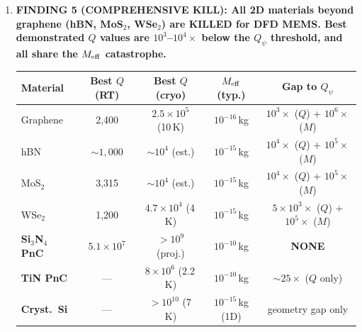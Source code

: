 \documentclass[11pt]{article}
\theoremstyle{definition}
\theoremstyle{remark}
\newcommand{\ee}[1]{\times 10^{#1}}
\newcommand{\Meff}{M_{\rm eff}}
\newcommand{\Qpsi}{Q_\psi}
\newcommand{\newfinding}[1]{\textcolor{teal}{\textbf{NEW FINDING:} #1}}
\begin{document}
\begin{tcolorbox}[colback=blue!5!white, colframe=blue!50!black,
  title=\textbf{W4i16 TOP 5 FINDINGS --- Ranked by Programme Impact}]
\begin{enumerate}
A metamaterial can increase local $u_{\rm EM}$ by concentrating the EM
field, but the total stored energy $U = u_{\rm EM} \times V_{\rm mode}$
is bounded by input power and EM $Q$. An SRF cavity already achieves
$Q_{\rm EM} \sim 10^{10}$ and $U \sim 10^{-2}$\,J. A metamaterial
concentrator with $V_{\rm meta} \sim 10^{-9}$\,m$^3$ reaches
$u_{\rm meta} \sim 10^7$\,J/m$^3$ but $U_{\rm meta} = 10^{-2}$\,J
--- \textbf{identical total stored energy, no net gain.}

Recent advances (Nature Comms.\ 2026: graded phononic metamaterials
on silicon wafers with $> 10^5$ unit cells; piezoelectric superlattice
phonon--polariton bandgaps, Frontiers in Physics 2025) demonstrate
that phononic bandgap engineering at the MEMS frequency scale
($\sim 1$\,MHz) is mature.

\newfinding{Phononic metamaterial vibration shield for MEMS. Bandgap
centred at MEMS defect mode ($\sim 1$\,MHz), bandwidth $\sim 100$\,kHz,
vibration isolation $> 60$\,dB. This directly addresses the Channel~B
dominant systematic (mechanical vibration, W3i9). Mount MEMS chip on
phononic metamaterial substrate. Compatible with all three tracks.
Cost \$10--30K. Should be added to Phase~II MEMS hardware specification
as a standard component.}

\item \textbf{FINDING 5 (COMPREHENSIVE KILL): All 2D materials beyond
graphene (hBN, MoS$_2$, WSe$_2$) are KILLED for DFD MEMS.
Best demonstrated $Q$ values are $10^3$--$10^4\times$ below the
$\Qpsi$ threshold, and all share the $\Meff$ catastrophe.}

\begin{center}
\begin{tabular}{l c c c c}
\toprule
\textbf{Material} & \textbf{Best $Q$ (RT)} & \textbf{Best $Q$ (cryo)}
& \textbf{$\Meff$ (typ.)} & \textbf{Gap to $\Qpsi$} \\
\midrule
Graphene & 2,400 & $2.5\ee{5}$ (10\,K) &
  $10^{-16}$\,kg & $10^3\times$ ($Q$) + $10^6\times$ ($M$) \\
hBN & $\sim 1{,}000$ & $\sim 10^4$ (est.) &
  $10^{-15}$\,kg & $10^4\times$ ($Q$) + $10^5\times$ ($M$) \\
MoS$_2$ & 3,315 & $\sim 10^4$ (est.) &
  $10^{-15}$\,kg & $10^4\times$ ($Q$) + $10^5\times$ ($M$) \\
WSe$_2$ & 1,200 & $4.7\ee{4}$ (4\,K) &
  $10^{-15}$\,kg & $5\ee{3}\times$ ($Q$) + $10^5\times$ ($M$) \\
\midrule
\textbf{Si$_3$N$_4$ PnC} & $5.1\ee{7}$ & $> 10^9$ (proj.) &
  $10^{-10}$\,kg & \textbf{NONE} \\
\textbf{TiN PnC} & --- & $8\ee{6}$ (2.2\,K) &
  $10^{-10}$\,kg & $\sim 25\times$ ($Q$ only) \\
\textbf{Cryst.\ Si} & --- & $> 10^{10}$ (7\,K) &
  $10^{-15}$\,kg (1D) & geometry gap only \\
\bottomrule
\end{tabular}
\end{center}


\end{enumerate}
\end{tcolorbox}
\end{document}
